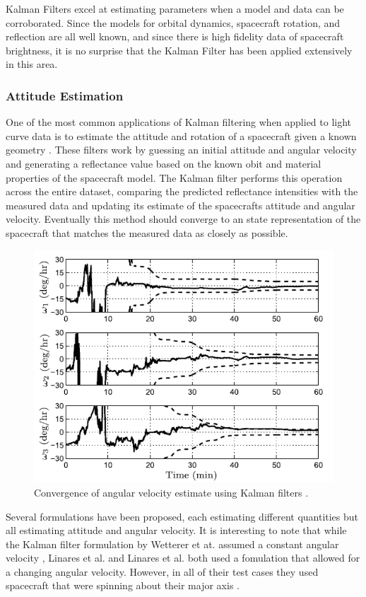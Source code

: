 \documentclass{article}
\begin{document}
Kalman Filters excel at estimating parameters when a model and data can be corroborated. Since the models for orbital dynamics, spacecraft rotation, and reflection are all well known, and since there is high fidelity data of spacecraft brightness, it is no surprise that the Kalman Filter has been applied extensively in this area.

\subsubsection{Attitude Estimation}
One of the most common applications of Kalman filtering when applied to light curve data is to estimate the attitude and rotation of a spacecraft given a known geometry \cite{AttitudeEstimationFromLightCurve} \cite{LINARES20141} \cite{SpaceObjectCharacterization}. These filters work by guessing an initial attitude and angular velocity and generating a reflectance value based on the known obit and material properties of the spacecraft model. The Kalman filter performs this operation across the entire dataset, comparing the predicted reflectance intensities with the measured data and updating its estimate of the spacecrafts attitude and angular velocity. Eventually this method should converge to an state representation of the spacecraft that matches the measured data as closely as possible.

\begin{figure}[h]
	\centering
	\includegraphics[width=.5\textwidth]{Kalman_convergence}
	\caption{Convergence of angular velocity estimate using Kalman filters \cite{SpaceObjectCharacterization}.}
\end{figure}

Several formulations have been proposed, each estimating different quantities but all estimating attitude and angular velocity. It is interesting to note that while the Kalman filter formulation by Wetterer et at. assumed a constant angular velocity \cite{AttitudeEstimationFromLightCurve}, Linares et al. and Linares et al. both used a fomulation that allowed for a changing angular velocity. However, in all of their test cases they used spacecraft that were spinning about their major axis \cite{LINARES20141} \cite{SpaceObjectCharacterization}.
\end{document}
